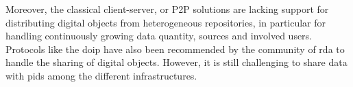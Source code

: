 \documentclass[conference]{IEEEtran}
\begin{document}
Moreover, the classical client-server, or P2P solutions are lacking support for distributing digital objects from heterogeneous repositories, in particular for handling continuously growing data quantity, sources and involved users. Protocols like the \gls{doip} have also been recommended by the community of \gls{rda} to handle the sharing of digital objects. However, it is still challenging to share data with \glspl{pid} among the different infrastructures.


\end{document}
